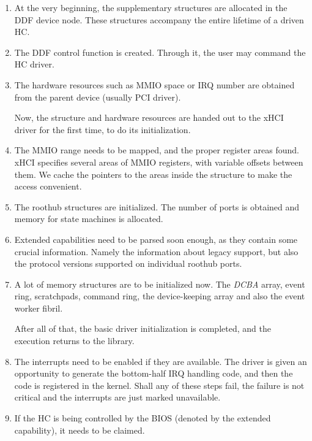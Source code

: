 \begin{enumerate}
\item
	At the very beginning, the supplementary structures are allocated in the
	DDF device node. These structures accompany the entire lifetime of a driven
	HC.

\item
	The DDF control function is created. Through it, the user may command the
	HC driver.

\item
	The hardware resources such as MMIO space or IRQ number are obtained from
	the parent device (usually PCI driver).

	Now, the structure and hardware resources are handed out to the xHCI driver for
	the first time, to do its initialization.

\item
	The MMIO range needs to be mapped, and the proper register areas found.
	xHCI specifies several areas of MMIO registers, with variable offsets
	between them. We cache the pointers to the areas inside the
	 structure to make the access convenient.

\item
	The roothub structures are initialized. The number of ports is obtained and
	memory for state machines is allocated.

\item
	Extended capabilities need to be parsed soon enough, as they contain some
	crucial information. Namely the information about legacy support, but also
	the protocol versions supported on individual roothub ports.

\item
	A lot of memory structures are to be initialized now. The \emph{DCBA}
	array, event ring, scratchpads, command ring, the device-keeping array and
	also the event worker fibril.

	After all of that, the basic driver initialization is completed, and the
	execution returns to the library.

\item
	The interrupts need to be enabled if they are available. The driver is
	given an opportunity to generate the bottom-half IRQ handling code, and
	then the code is registered in the kernel. Shall any of these steps fail,
	the failure is not critical and the interrupts are just marked unavailable.

\item
	If the HC is being controlled by the BIOS (denoted by the extended
	capability), it needs to be claimed.


\end{enumerate}
